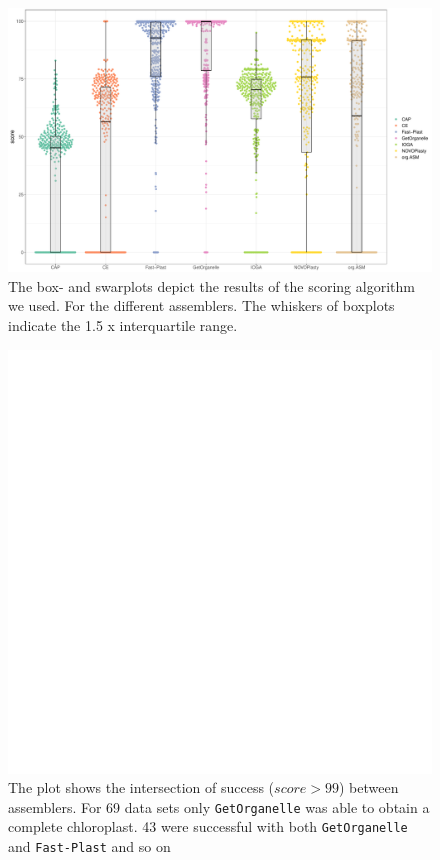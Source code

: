 \documentclass{bmcart}
\newcommand{\formatprogramnames}[1]{\texttt{#1}}
\newcommand{\fp}{\formatprogramnames{Fast-Plast}}
\newcommand{\go}{\formatprogramnames{GetOrganelle}}
\begin{document}
\begin{backmatter}
  \begin{figure}[h!]
  \includegraphics[width=\textwidth]{plots/swarm.pdf}
  \caption{
  The box- and swarplots depict the results of the scoring algorithm we used. For the different assemblers. The whiskers of boxplots indicate the 1.5 x interquartile range. 
    }
      \label{fig:swarmplot}
      \end{figure}

\begin{figure}[h!]
  \includegraphics[width=\textwidth,page=2]{plots/upset.pdf}
  \caption{
      The plot shows the intersection of success ($score > 99$) between assemblers. For \num{69} data sets only \go{} was able to obtain a complete chloroplast. \num{43} were successful with both \go{} and \fp{} and so on}
            \label{fig:upset}
      \end{figure}


\end{backmatter}
\end{document}
